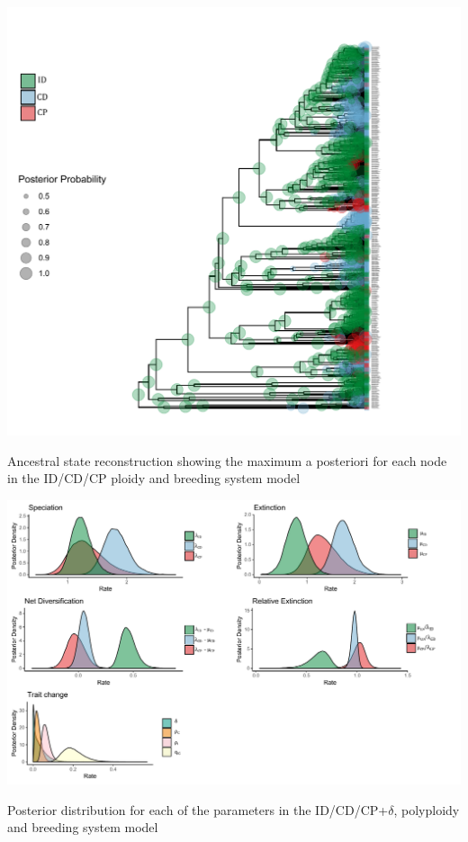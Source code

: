 \begin{suppfigure}
\includegraphics[width=\textwidth]{asrIDCDCP.pdf}
\caption{Ancestral state reconstruction showing the maximum a posteriori for each node in the ID/CD/CP ploidy and breeding system model} %
\label{suppfigure:IDCDCPnodipasr}
\end{suppfigure}

\begin{suppfigure}
\includegraphics[width=\textwidth]{musseDPSIposteriordist.pdf}
\caption{Posterior distribution for each of the parameters in the ID/CD/CP+$\delta$, polyploidy and breeding system model} %
\label{suppfigure:IDCDCP}
\end{suppfigure}

